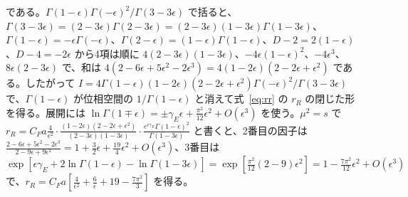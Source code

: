 \documentclass[a4paper,10pt]{ltjsarticle}
\begin{document}
である。$\Gamma(1-\epsilon)\Gamma(-\epsilon)^2/\Gamma(3-3\epsilon)$ で括ると、$\Gamma(3-3\epsilon)=(2-3\epsilon)\Gamma(2-3\epsilon)=(2-3\epsilon)(1-3\epsilon)\Gamma(1-3\epsilon)$、$\Gamma(1-\epsilon)=-\epsilon\Gamma(-\epsilon)$、$\Gamma(2-\epsilon)=(1-\epsilon)\Gamma(1-\epsilon)$、$D-2=2(1-\epsilon)$、$D-4=-2\epsilon$ から4項は順に $4(2-3\epsilon)(1-3\epsilon)$、$-4\epsilon(1-\epsilon)^2$、$-4\epsilon^3$、$8\epsilon(2-3\epsilon)$ で、和は $4(2-6\epsilon+5\epsilon^2-2\epsilon^3)=4(1-2\epsilon)(2-2\epsilon+\epsilon^2)$ である。したがって $I=4\Gamma(1-\epsilon)(1-2\epsilon)(2-2\epsilon+\epsilon^2)\Gamma(-\epsilon)^2/\Gamma(3-3\epsilon)$ で、$\Gamma(1-\epsilon)$ が位相空間の $1/\Gamma(1-\epsilon)$ と消えて式~\eqref{eq:rr} の $r_R$ の閉じた形を得る。展開には $\ln\Gamma(1\mp\epsilon)=\pm\gamma_E\epsilon+\frac{\pi^2}{12}\epsilon^2+O(\epsilon^3)$ を使う。$\mu^2=s$ で $r_R=C_Fa\frac4{\epsilon^2}\cdot\frac{(1-2\epsilon)(2-2\epsilon+\epsilon^2)}{(2-3\epsilon)(1-3\epsilon)}\cdot\frac{e^{\epsilon\gamma_E}\Gamma(1-\epsilon)^2}{\Gamma(1-3\epsilon)}$ と書くと、2番目の因子は $\frac{2-6\epsilon+5\epsilon^2-2\epsilon^3}{2-9\epsilon+9\epsilon^2}=1+\frac32\epsilon+\frac{19}4\epsilon^2+O(\epsilon^3)$、3番目は $\exp[\epsilon\gamma_E+2\ln\Gamma(1-\epsilon)-\ln\Gamma(1-3\epsilon)]=\exp[\frac{\pi^2}{12}(2-9)\epsilon^2]=1-\frac{7\pi^2}{12}\epsilon^2+O(\epsilon^3)$ で、$r_R=C_Fa[\frac4{\epsilon^2}+\frac6\epsilon+19-\frac{7\pi^2}3]$ を得る。
\end{document}
